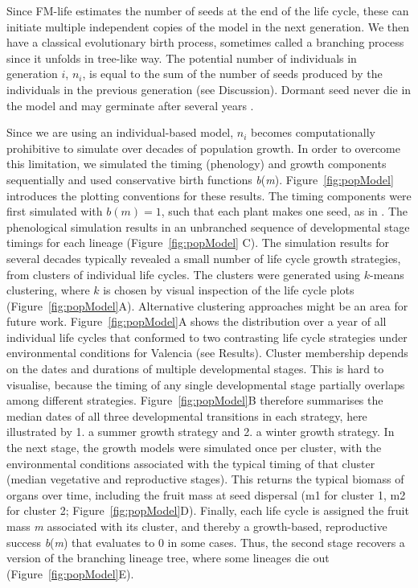 Since FM-life estimates the number of seeds at the end of the life cycle, these
can initiate multiple independent copies of the model in the next generation. We
then have a classical evolutionary birth process, sometimes called a branching
process since it unfolds in tree-like way. The potential number of individuals
in generation \(i\), \(n_{i}\), is equal to the sum of the number of seeds
produced by the individuals in the previous generation (see Discussion). Dormant
seed never die in the model and may germinate after several years
\citep{burghardt_modeling_2015}.

Since we are using an individual-based model, \(n_{i}\) becomes computationally
prohibitive to simulate over decades of population growth. In order to overcome
this limitation, we simulated the timing (phenology) and growth components
sequentially and used conservative birth functions
\emph{b}(\emph{m}). Figure~\ref{fig:popModel} introduces the plotting
conventions for these results. The timing components were first simulated with
\(b(m) = 1\), such that each plant makes one seed, as in
\citet{burghardt_modeling_2015}. The phenological simulation results in an
unbranched sequence of developmental stage timings for each lineage (Figure~\ref{fig:popModel}
C). The simulation results for several decades typically revealed a small
number of life cycle growth strategies, from clusters of individual life
cycles. The clusters were generated using \(k\)-means clustering, where \(k\) is
chosen by visual inspection of the life cycle plots
(Figure~\ref{fig:popModel}A). Alternative clustering approaches might be an area
for future work. Figure~\ref{fig:popModel}A shows the distribution over a year
of all individual life cycles that conformed to two contrasting life cycle
strategies under environmental conditions for Valencia (see Results).  Cluster
membership depends on the dates and durations of multiple developmental
stages. This is hard to visualise, because the timing of any single
developmental stage partially overlaps among different
strategies. Figure~\ref{fig:popModel}B therefore summarises the median dates of
all three developmental transitions in each strategy, here illustrated by 1. a
summer growth strategy and 2. a winter growth strategy. In the next stage, the
growth models were simulated once per cluster, with the environmental conditions
associated with the typical timing of that cluster (median vegetative and
reproductive stages). This returns the typical biomass of organs over time,
including the fruit mass at seed dispersal (m1 for cluster 1, m2 for cluster 2;
Figure~\ref{fig:popModel}D). Finally, each life cycle is assigned the fruit mass
\emph{m} associated with its cluster, and thereby a growth-based, reproductive
success \emph{b}(\emph{m}) that evaluates to 0 in some cases. Thus, the second
stage recovers a version of the branching lineage tree, where some lineages die
out (Figure~\ref{fig:popModel}E).

